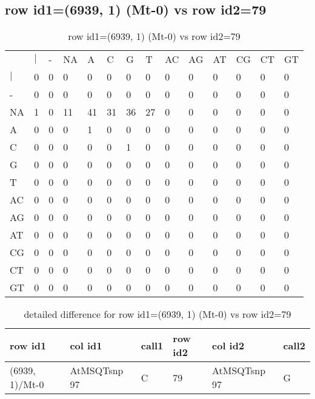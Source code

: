 \subsection{row id1=(6939, 1) (Mt-0) vs row id2=79}
\begin{center}
\begin{longtable}{|l|l|l|l|l|l|l|l|l|l|l|l|l|l|}
\caption{row id1=(6939, 1) (Mt-0) vs row id2=79} \label{table_dm140}\\
\hline
\\
\hline
&$|$&-&NA&A&C&G&T&AC&AG&AT&CG&CT&GT\\
$|$&0&0&0&0&0&0&0&0&0&0&0&0&0\\
-&0&0&0&0&0&0&0&0&0&0&0&0&0\\
NA&1&0&11&41&31&36&27&0&0&0&0&0&0\\
A&0&0&0&1&0&0&0&0&0&0&0&0&0\\
C&0&0&0&0&0&1&0&0&0&0&0&0&0\\
G&0&0&0&0&0&0&0&0&0&0&0&0&0\\
T&0&0&0&0&0&0&0&0&0&0&0&0&0\\
AC&0&0&0&0&0&0&0&0&0&0&0&0&0\\
AG&0&0&0&0&0&0&0&0&0&0&0&0&0\\
AT&0&0&0&0&0&0&0&0&0&0&0&0&0\\
CG&0&0&0&0&0&0&0&0&0&0&0&0&0\\
CT&0&0&0&0&0&0&0&0&0&0&0&0&0\\
GT&0&0&0&0&0&0&0&0&0&0&0&0&0\\
\hline
\end{longtable}
\end{center}

\begin{center}
\begin{longtable}{|l|l|l|l|l|l|}
\caption{detailed difference for row id1=(6939, 1) (Mt-0) vs row id2=79} \label{table_dm141}\\
\hline
row id1&col id1&call1&row id2&col id2&call2\\
\hline
(6939, 1)/Mt-0&AtMSQTsnp 97&C&79&AtMSQTsnp 97&G\\
\hline
\end{longtable}
\end{center}

